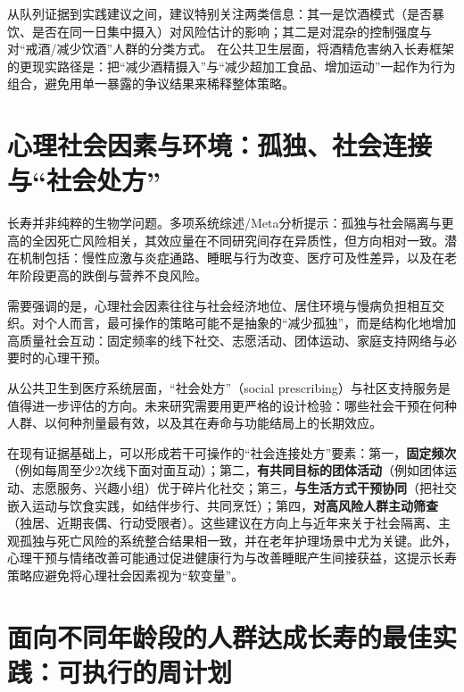 \documentclass[11pt,a4paper]{article}
\begin{document}
从队列证据到实践建议之间，建议特别关注两类信息：其一是饮酒模式（是否暴饮、是否在同一日集中摄入）对风险估计的影响；其二是对混杂的控制强度与对“戒酒/减少饮酒”人群的分类方式。\cite{associationofalcohol2021,theassociationbetween20241} 在公共卫生层面，将酒精危害纳入长寿框架的更现实路径是：把“减少酒精摄入”与“减少超加工食品、增加运动”一起作为行为组合，避免用单一暴露的争议结果来稀释整体策略。

\section{心理社会因素与环境：孤独、社会连接与“社会处方”}

长寿并非纯粹的生物学问题。多项系统综述/Meta分析提示：孤独与社会隔离与更高的全因死亡风险相关，其效应量在不同研究间存在异质性，但方向相对一致\cite{associationofloneliness2018,associationsbetweenloneliness2018,socialisolationand2018}。潜在机制包括：慢性应激与炎症通路、睡眠与行为改变、医疗可及性差异，以及在老年阶段更高的跌倒与营养不良风险。

需要强调的是，心理社会因素往往与社会经济地位、居住环境与慢病负担相互交织。对个人而言，最可操作的策略可能不是抽象的“减少孤独”，而是结构化地增加高质量社会互动：固定频率的线下社交、志愿活动、团体运动、家庭支持网络与必要时的心理干预。\cite{impactofsocial2020,socialdisconnectednessperceived2020}

从公共卫生到医疗系统层面，“社会处方”（social prescribing）与社区支持服务是值得进一步评估的方向。未来研究需要用更严格的设计检验：哪些社会干预在何种人群、以何种剂量最有效，以及其在寿命与功能结局上的长期效应。

在现有证据基础上，可以形成若干可操作的“社会连接处方”要素：第一，\textbf{固定频次}（例如每周至少2次线下面对面互动）；第二，\textbf{有共同目标的团体活动}（例如团体运动、志愿服务、兴趣小组）优于碎片化社交；第三，\textbf{与生活方式干预协同}（把社交嵌入运动与饮食实践，如结伴步行、共同烹饪）；第四，\textbf{对高风险人群主动筛查}（独居、近期丧偶、行动受限者）。这些建议在方向上与近年来关于社会隔离、主观孤独与死亡风险的系统整合结果相一致\cite{socialisolationand2020,lonelinessandsocial2020,factorsassociatedwith2020}，并在老年护理场景中尤为关键\cite{lonelinessinnursing2016,lonelinessinthe2017}。此外，心理干预与情绪改善可能通过促进健康行为与改善睡眠产生间接获益，这提示长寿策略应避免将心理社会因素视为“软变量”。\cite{theeffectof2016}

\section{面向不同年龄段的人群达成长寿的最佳实践：可执行的周计划}
\end{document}
